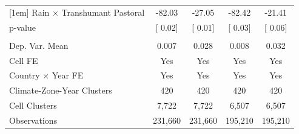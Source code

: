 {\begin{tabular}{l*{4}{c}}
[1em] \hspace{15pt} Rain $\times$ Transhumant Pastoral&-82.03         &-27.05         &-82.42         &-21.41         \\
\hspace{15pt} p-value&[     0.02]         &[     0.01]         &[     0.03]         &[     0.06]         \\
\hline \\ Dep. Var. Mean& 0.007         & 0.028         & 0.008         & 0.032         \\
Cell FE             &   Yes         &   Yes         &   Yes         &   Yes         \\
Country $\times$ Year FE&   Yes         &   Yes         &   Yes         &   Yes         \\
Climate-Zone-Year Clusters&   420         &   420         &   420         &   420         \\
Cell Clusters       & 7,722         & 7,722         & 6,507         & 6,507         \\
Observations        &231,660         &231,660         &195,210         &195,210         \\
\bottomrule
\end{tabular}
}
